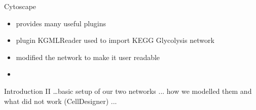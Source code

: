 \begin{frame}{Cytoscape}
	\begin{itemize}
		\item provides many useful plugins 
		\item plugin KGMLReader used to import KEGG Glycolysis network
		\item modified the network to make it user readable
		\item 
	\end{itemize}
\end{frame}


\begin{frame}{Introduction II}
\dots basic setup of our two networks ... how we modelled them and what did not work (CellDesigner) ...
\end{frame}


